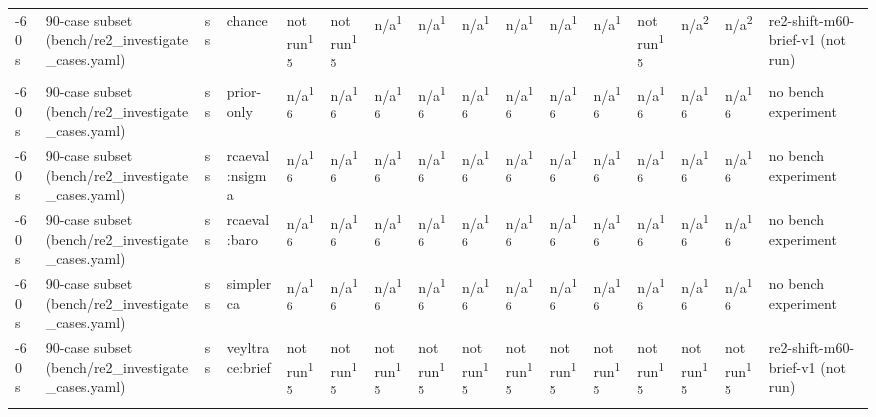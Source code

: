 \begin{table}[t]
\begin{tabular}{llllllllllllllll}
-60 s & 90-case subset (bench/re2\_investigate\_cases.yaml) & ss & chance & not run\textsuperscript{15} & not run\textsuperscript{15} & n/a\textsuperscript{1} & n/a\textsuperscript{1} & n/a\textsuperscript{1} & n/a\textsuperscript{1} & n/a\textsuperscript{1} & n/a\textsuperscript{1} & not run\textsuperscript{15} & n/a\textsuperscript{2} & n/a\textsuperscript{2} & re2-shift-m60-brief-v1 (not run) \\
-60 s & 90-case subset (bench/re2\_investigate\_cases.yaml) & ss & prior-only & n/a\textsuperscript{16} & n/a\textsuperscript{16} & n/a\textsuperscript{16} & n/a\textsuperscript{16} & n/a\textsuperscript{16} & n/a\textsuperscript{16} & n/a\textsuperscript{16} & n/a\textsuperscript{16} & n/a\textsuperscript{16} & n/a\textsuperscript{16} & n/a\textsuperscript{16} & no bench experiment \\
-60 s & 90-case subset (bench/re2\_investigate\_cases.yaml) & ss & rcaeval:nsigma & n/a\textsuperscript{16} & n/a\textsuperscript{16} & n/a\textsuperscript{16} & n/a\textsuperscript{16} & n/a\textsuperscript{16} & n/a\textsuperscript{16} & n/a\textsuperscript{16} & n/a\textsuperscript{16} & n/a\textsuperscript{16} & n/a\textsuperscript{16} & n/a\textsuperscript{16} & no bench experiment \\
-60 s & 90-case subset (bench/re2\_investigate\_cases.yaml) & ss & rcaeval:baro & n/a\textsuperscript{16} & n/a\textsuperscript{16} & n/a\textsuperscript{16} & n/a\textsuperscript{16} & n/a\textsuperscript{16} & n/a\textsuperscript{16} & n/a\textsuperscript{16} & n/a\textsuperscript{16} & n/a\textsuperscript{16} & n/a\textsuperscript{16} & n/a\textsuperscript{16} & no bench experiment \\
-60 s & 90-case subset (bench/re2\_investigate\_cases.yaml) & ss & simplerca & n/a\textsuperscript{16} & n/a\textsuperscript{16} & n/a\textsuperscript{16} & n/a\textsuperscript{16} & n/a\textsuperscript{16} & n/a\textsuperscript{16} & n/a\textsuperscript{16} & n/a\textsuperscript{16} & n/a\textsuperscript{16} & n/a\textsuperscript{16} & n/a\textsuperscript{16} & no bench experiment \\
-60 s & 90-case subset (bench/re2\_investigate\_cases.yaml) & ss & veyltrace:brief & not run\textsuperscript{15} & not run\textsuperscript{15} & not run\textsuperscript{15} & not run\textsuperscript{15} & not run\textsuperscript{15} & not run\textsuperscript{15} & not run\textsuperscript{15} & not run\textsuperscript{15} & not run\textsuperscript{15} & not run\textsuperscript{15} & not run\textsuperscript{15} & re2-shift-m60-brief-v1 (not run) \\

\end{tabular}
\end{table}
